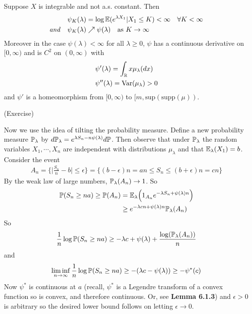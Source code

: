\documentclass[12pt,a4paper]{report}
\newenvironment{proof}
{\begin{changemargin}{1cm}{0.5cm} 
	}%
	{\end{changemargin}
}
\newenvironment{subproof}
{\begin{changemargin}{0.5cm}{0.5cm} 
	}%
	{\end{changemargin}
}
\begin{document}
\begin{proof}
\begin{subproof}
 Suppose $X$ is integrable and not a.s. constant. Then 
\begin{align*}
& \psi_K(\lambda) = \log \mathbb{E}(e^{\lambda X_1}|X_1 \leq K) < \infty \quad \forall K < \infty \\
\text{\emph{and}} \quad & \psi_K(\lambda) \nearrow \psi(\lambda) \quad \text{as } K\rightarrow \infty
\end{align*}
Moreover in the case $\psi(\lambda) < \infty$ for all $\lambda \geq 0$, $\psi$ has a continuous derivative on $[0,\infty)$ and is $C^2$ on $(0,\infty)$ with
\begin{align*}
& \psi'(\lambda) = \int_{\mathbb{R}} x\mu_{\lambda}(dx) \\
& \psi''(\lambda) = \text{Var}(\mu_{\lambda}) > 0
\end{align*}
and $\psi'$ is a homeomorphism from $[0,\infty)$ to $[m, \text{sup}(\text{supp}(\mu))$.

\pf (Exercise)
\end{subproof}

\quad Now we use the idea of tilting the probability measure. Define a new probability measure $\mathbb{P}_{\lambda}$ by $d\mathbb{P}_{\lambda} = e^{\lambda S_n -n \psi(\lambda)} d\mathbb{P}$. Then observe that under $\mathbb{P}_{\lambda}$ the random variables $X_1, \cdots, X_n$ are independent with distributions $\mu_{\lambda}$ and that $\mathbb{E}_{\lambda}(X_1) = b$. Consider the event
\begin{align*}
A_n = \{\Big| \frac{S_n}{n} -b \Big| \leq \epsilon \} = \{ (b- \epsilon)n = an \leq S_n \leq (b + \epsilon)n =cn \}
\end{align*}
By the weak law of large numbers, $\mathbb{P}_{\lambda}(A_n ) \rightarrow 1$. So
\begin{align*}
\mathbb{P}(S_n \geq na) \geq \mathbb{P}(A_n) &= \mathbb{E}_{\lambda} \Big( 1_{A_n} e^{-\lambda S_n + \psi(\lambda)n} \Big) \\
&\geq e^{-\lambda cn + \psi(\lambda) n} \mathbb{P}_{\lambda}(A_n)
\end{align*}
So 
\begin{align*}
\frac{1}{n} \log \mathbb{P} (S_n \geq na) \geq -\lambda c + \psi(\lambda) + \frac{\log (\mathbb{P}_{\lambda} (A_n))}{n}
\end{align*}
and
\begin{align*}
\liminf_{n\rightarrow \infty} \frac{1}{n} \log \mathbb{P}(S_n \geq na) \geq -(\lambda c - \psi(\lambda)) \geq -\psi^* (c)
\end{align*}
Now $\psi^*$ is continuous at $a$ (recall, $\psi^*$ is a Legendre transform of a convex function so is convex, and therefore continuous. Or, see \textbf{Lemma 6.1.3}) and $\epsilon >0$ is arbitrary so the desired lower bound follows on letting  $\epsilon \rightarrow 0$.
\s


\end{proof}
\end{document}
